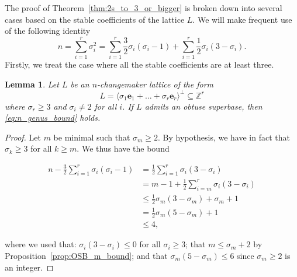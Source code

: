 \documentclass{amsart} %
\newcommand{\Z}{\mathbb{Z}}
\newcommand{\e}{\bm{e}}
\theoremstyle{thm}
\newtheorem{lem}[Theorem]{Lemma}
\theoremstyle{definition}
\numberwithin{equation}{section}
\begin{document}
The proof of Theorem~\ref{thm:2s_to_3_or_bigger} is broken down into several cases based on the stable coefficients of the lattice $L$. We will make frequent use of the following identity
\begin{equation}\label{eq:genus_bound_identity}
  n= \sum_{i=1}^r\sigma_i^2= \sum_{i=1}^r\frac32 \sigma_i(\sigma_i-1) + \sum_{i=1}^r\frac12 \sigma_i(3-\sigma_i).
\end{equation}
Firstly, we treat the case where all the stable coefficients are at least three.
\begin{lem}\label{lem:genus_bound_no_twos}
Let $L$ be an $n$-changemaker lattice of the form
\[
L=\langle \sigma_1 \e_1+ \dots+ \sigma_r \e_r\rangle^\bot\subseteq \Z^r
\]
where $\sigma_r\geq 3$ and $\sigma_i\neq 2$ for all $i$. If $L$ admits an obtuse superbase, then \eqref{eq:n_genus_bound} holds.
\end{lem}
\begin{proof}
    Let $m$ be minimal such that $\sigma_m\geq 2$. By hypothesis, we have in fact that $\sigma_k\geq 3$ for all $k\geq m$. We thus have the bound

\begin{align*}
n - \frac32\sum_{i=1}^r   \sigma_i(\sigma_i-1) &= \frac12\sum_{i=1}^r \sigma_i(3-\sigma_i)\\
& = m-1+\frac12\sum_{i=m}^r \sigma_i(3-\sigma_i)\\
&\leq \frac12 \sigma_m(3-\sigma_m) +\sigma_m+1\\
&=  \frac12 \sigma_m(5-\sigma_m)+1\\
&\leq 4,
\end{align*}

where we used that: $\sigma_i(3-\sigma_i)\leq 0$ for all $\sigma_i\geq 3$; that $m\leq \sigma_m+2$ by Proposition~\ref{prop:OSB_m_bound}; and that $\sigma_m(5-\sigma_m)\leq 6$ since $\sigma_m\geq 2$ is an integer.
\end{proof}
\end{document}
